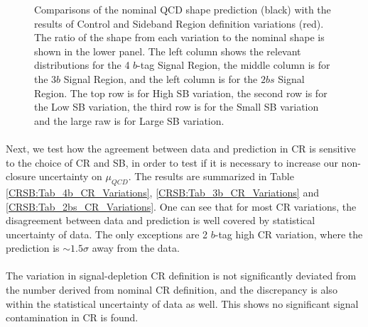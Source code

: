\begin{figure}[htbp!]
\begin{center}
\end{center}
\caption{Comparisons of the nominal QCD shape prediction (black) with the results of Control and Sideband Region definition variations (red). The ratio of the shape from each variation to the nominal shape is shown in the lower panel. The left column shows the relevant distributions for the 4 $b$-tag Signal Region, the middle column is for the $3b$ Signal Region, and the left column is for the $2bs$ Signal Region. The top row is for High SB variation, the second row is for the Low SB variation, the third row is for the Small SB variation and the large raw is for Large SB variation.}
\label{CRSB:QCDShapeSR-SB}
\end{figure}

\paragraph{}
Next, we test how the agreement between data and prediction in CR is sensitive to the choice of CR and SB, in order to test if it is necessary to increase our non-closure uncertainty on $\mu_{QCD}$. The results are summarized in Table \ref{CRSB:Tab_4b_CR_Variations}, \ref{CRSB:Tab_3b_CR_Variations} and \ref{CRSB:Tab_2bs_CR_Variations}. One can see that for most CR variations, the disagreement between data and prediction is well covered by statistical uncertainty of data. The only exceptions are 2 $b$-tag high CR variation, where the prediction is $\sim 1.5 \sigma$ away from the data. 

\paragraph{}
The variation in signal-depletion CR definition is not significantly deviated from the number derived from nominal CR definition, and the discrepancy is also within the statistical uncertainty of data as well. This shows no significant signal contamination in CR is found.


\clearpage
